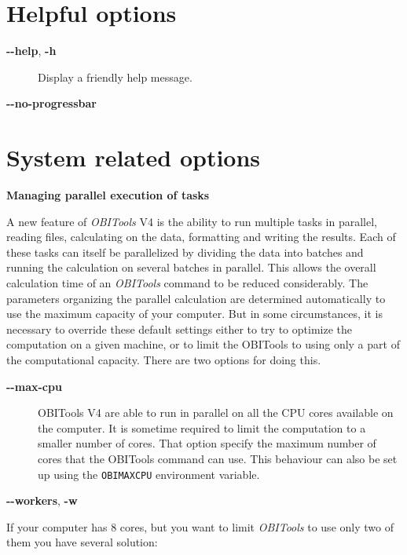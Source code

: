 \documentclass[
  letterpaper,
  DIV=11,
  numbers=noendperiod]{scrreprt}
\begin{document}
\hypertarget{helpful-options}{%
\section{Helpful options}\label{helpful-options}}

\begin{description}
\item[\textbf{-\/-help}, \textbf{-h}]
Display a friendly help message.
\end{description}

\textbf{-\/-no-progressbar}

\hypertarget{system-related-options}{%
\section{System related options}\label{system-related-options}}

\textbf{Managing parallel execution of tasks}

A new feature of \emph{OBITools} V4 is the ability to run multiple tasks
in parallel, reading files, calculating on the data, formatting and
writing the results. Each of these tasks can itself be parallelized by
dividing the data into batches and running the calculation on several
batches in parallel. This allows the overall calculation time of an
\emph{OBITools} command to be reduced considerably. The parameters
organizing the parallel calculation are determined automatically to use
the maximum capacity of your computer. But in some circumstances, it is
necessary to override these default settings either to try to optimize
the computation on a given machine, or to limit the OBITools to using
only a part of the computational capacity. There are two options for
doing this.

\begin{description}
\item[\textbf{-\/-max-cpu}]
OBITools V4 are able to run in parallel on all the CPU cores available
on the computer. It is sometime required to limit the computation to a
smaller number of cores. That option specify the maximum number of cores
that the OBITools command can use. This behaviour can also be set up
using the \texttt{OBIMAXCPU} environment variable.
\end{description}

\textbf{-\/-workers}, \textbf{-w}

If your computer has 8 cores, but you want to limit \emph{OBITools} to
use only two of them you have several solution:
\end{document}
